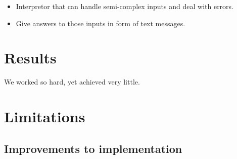 \documentclass[12pt]{article}
\theoremstyle{definition}
\theoremstyle{theorem}
\begin{document}
\begin{itemize}
    \item Interpretor that can handle semi-complex inputs and deal with errors.
    \item Give answers to those inputs in form of text messages.
\end{itemize}    

\section{Results}\label{results}
We worked so hard, yet achieved very little.

\section{Limitations}\label{limitations}

\subsection{Improvements to implementation}



\end{document}
